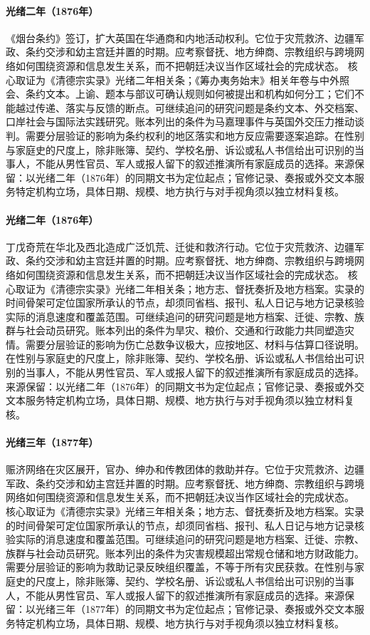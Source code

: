 \hypertarget{public:EQ-1876-CHEFOO-CONVENTION}{}\paragraph{光绪二年（1876年）}《烟台条约》签订，扩大英国在华通商和内地活动权利。它位于灾荒救济、边疆军政、条约交涉和幼主宫廷并置的时期。应考察督抚、地方绅商、宗教组织与跨境网络如何围绕资源和信息发生关系，而不把朝廷决议当作区域社会的完成状态。 核心取证为《清德宗实录》光绪二年相关条；《筹办夷务始末》相关年卷与中外照会、条约文本。上谕、题本与部议可确认规则如何被提出和机构如何分工；它们不能越过传递、落实与反馈的断点。可继续追问的研究问题是条约文本、外交档案、口岸社会与国际法实践研究。账本列出的条件为马嘉理事件与英国外交压力推动谈判。需要分层验证的影响为条约权利的地区落实和地方反应需要逐案追踪。在性别与家庭史的尺度上，除非账簿、契约、学校名册、诉讼或私人书信给出可识别的当事人，不能从男性官员、军人或报人留下的叙述推演所有家庭成员的选择。来源保留：以光绪二年（1876年）的同期文书为定位起点；官修记录、奏报或外交文本服务特定机构立场，具体日期、规模、地方执行与对手视角须以独立材料复核。
\hypertarget{public:EQ-1876-NORTH-CHINA-FAMINE}{}\paragraph{光绪二年（1876年）}丁戊奇荒在华北及西北造成广泛饥荒、迁徙和救济行动。它位于灾荒救济、边疆军政、条约交涉和幼主宫廷并置的时期。应考察督抚、地方绅商、宗教组织与跨境网络如何围绕资源和信息发生关系，而不把朝廷决议当作区域社会的完成状态。 核心取证为《清德宗实录》光绪二年相关条；地方志、督抚奏折及地方档案。实录的时间骨架可定位国家所承认的节点，却须同省档、报刊、私人日记与地方记录核验实际的消息速度和覆盖范围。可继续追问的研究问题是地方档案、迁徙、宗教、族群与社会动员研究。账本列出的条件为旱灾、粮价、交通和行政能力共同塑造灾情。需要分层验证的影响为伤亡总数争议极大，应按地区、材料与估算口径说明。在性别与家庭史的尺度上，除非账簿、契约、学校名册、诉讼或私人书信给出可识别的当事人，不能从男性官员、军人或报人留下的叙述推演所有家庭成员的选择。来源保留：以光绪二年（1876年）的同期文书为定位起点；官修记录、奏报或外交文本服务特定机构立场，具体日期、规模、地方执行与对手视角须以独立材料复核。
\hypertarget{public:EQ-1877-FAMINE-RELIEF-NETWORKS}{}\paragraph{光绪三年（1877年）}赈济网络在灾区展开，官办、绅办和传教团体的救助并存。它位于灾荒救济、边疆军政、条约交涉和幼主宫廷并置的时期。应考察督抚、地方绅商、宗教组织与跨境网络如何围绕资源和信息发生关系，而不把朝廷决议当作区域社会的完成状态。 核心取证为《清德宗实录》光绪三年相关条；地方志、督抚奏折及地方档案。实录的时间骨架可定位国家所承认的节点，却须同省档、报刊、私人日记与地方记录核验实际的消息速度和覆盖范围。可继续追问的研究问题是地方档案、迁徙、宗教、族群与社会动员研究。账本列出的条件为灾害规模超出常规仓储和地方财政能力。需要分层验证的影响为救助记录反映组织覆盖，不等于所有灾民获救。在性别与家庭史的尺度上，除非账簿、契约、学校名册、诉讼或私人书信给出可识别的当事人，不能从男性官员、军人或报人留下的叙述推演所有家庭成员的选择。来源保留：以光绪三年（1877年）的同期文书为定位起点；官修记录、奏报或外交文本服务特定机构立场，具体日期、规模、地方执行与对手视角须以独立材料复核。
